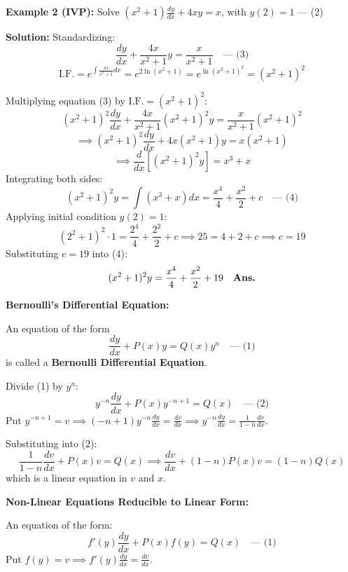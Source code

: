 \documentclass[11pt,a4paper]{article}
\newcommand{\Heading}[1]{\vspace{0.3cm}\noindent\textbf{\textcolor{AcademicGreen}{\large #1}}\par\vspace{0.15cm}}
\begin{document}
\vspace{0.3cm}
\begin{tcolorbox}[greenbox]
    \textbf{\textcolor{AcademicGreen}{Example 2 (IVP):}} Solve $(x^2 + 1)\frac{dy}{dx} + 4xy = x$, with $y(2) = 1$ \quad --- (2)
    
    \vspace{0.15cm}
    \noindent\textbf{Solution:} Standardizing:
    \[
    \frac{dy}{dx} + \frac{4x}{x^2 + 1}y = \frac{x}{x^2 + 1} \quad \text{--- (3)}
    \]
    \[
    \text{I.F.} = e^{\int \frac{4x}{x^2 + 1}dx} = e^{2\ln(x^2 + 1)} = e^{\ln(x^2 + 1)^2} = (x^2 + 1)^2
    \]

Multiplying equation (3) by $\text{I.F.} = (x^2 + 1)^2$:
\[
(x^2 + 1)^2 \frac{dy}{dx} + \frac{4x}{x^2 + 1}(x^2 + 1)^2 y = \frac{x}{x^2 + 1}(x^2 + 1)^2
\]
\[
\implies (x^2 + 1)^2 \frac{dy}{dx} + 4x(x^2 + 1)y = x(x^2 + 1)
\]
\[
\implies \frac{d}{dx}\left[(x^2 + 1)^2 y\right] = x^3 + x
\]
Integrating both sides:
\[
(x^2 + 1)^2 y = \int (x^3 + x) dx = \frac{x^4}{4} + \frac{x^2}{2} + c \quad \text{--- (4)}
\]
Applying initial condition $y(2) = 1$:
\[
(2^2 + 1)^2 \cdot 1 = \frac{2^4}{4} + \frac{2^2}{2} + c \implies 25 = 4 + 2 + c \implies c = 19
\]
Substituting $c = 19$ into (4):
\[
(x^2 + 1)^2 y = \frac{x^4}{4} + \frac{x^2}{2} + 19 \quad \text{\textbf{Ans.}}
\]

\end{tcolorbox}

\newpage

\vspace{0.4cm}
\Heading{Bernoulli's Differential Equation:}
An equation of the form
\begin{equation}
    \frac{dy}{dx} + P(x)y = Q(x)y^n \quad \text{--- (1)}
\end{equation}
is called a \textbf{Bernoulli Differential Equation}.

\vspace{0.15cm}
\noindent Divide (1) by $y^n$:
\[
y^{-n}\frac{dy}{dx} + P(x)y^{-n+1} = Q(x) \quad \text{--- (2)}
\]
Put $y^{-n+1} = v \implies (-n+1)y^{-n}\frac{dy}{dx} = \frac{dv}{dx} \implies y^{-n}\frac{dy}{dx} = \frac{1}{1-n}\frac{dv}{dx}$.

\noindent Substituting into (2):
\[
\frac{1}{1-n}\frac{dv}{dx} + P(x)v = Q(x) \implies \frac{dv}{dx} + (1-n)P(x)v = (1-n)Q(x)
\]
which is a linear equation in $v$ and $x$.

\vspace{0.3cm}
\Heading{Non-Linear Equations Reducible to Linear Form:}
An equation of the form:
\[
f'(y)\frac{dy}{dx} + P(x)f(y) = Q(x) \quad \text{--- (1)}
\]
Put $f(y) = v \implies f'(y)\frac{dy}{dx} = \frac{dv}{dx}$.
\end{document}
